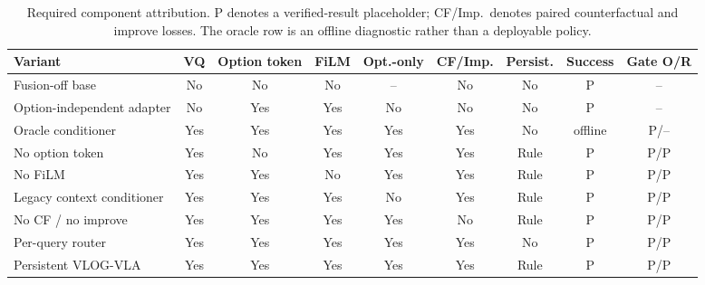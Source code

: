 \begin{table}[t]
\centering
\scriptsize
\setlength{\tabcolsep}{3.5pt}
\begin{tabular}{p{}cccccccc}
\toprule
Variant & VQ & Option token & FiLM & Opt.-only & CF/Imp. & Persist. & Success & Gate O/R \\
\midrule
Fusion-off base & No & No & No & -- & No & No & P & -- \\
Option-independent adapter & No & Yes & Yes & No & No & No & P & -- \\
Oracle conditioner & Yes & Yes & Yes & Yes & Yes & No & offline & P/-- \\
No option token & Yes & No & Yes & Yes & Yes & Rule & P & P/P \\
No FiLM & Yes & Yes & No & Yes & Yes & Rule & P & P/P \\
Legacy context conditioner & Yes & Yes & Yes & No & Yes & Rule & P & P/P \\
No CF / no improve & Yes & Yes & Yes & Yes & No & Rule & P & P/P \\
Per-query router & Yes & Yes & Yes & Yes & Yes & No & P & P/P \\
Persistent VLOG-VLA & Yes & Yes & Yes & Yes & Yes & Rule & P & P/P \\
\bottomrule
\end{tabular}
\caption{Required component attribution.  P denotes a verified-result
placeholder; CF/Imp.\ denotes paired counterfactual and improve losses.
The oracle row is an offline diagnostic rather than a deployable policy.}
\label{tab:ablation-results}
\end{table}
